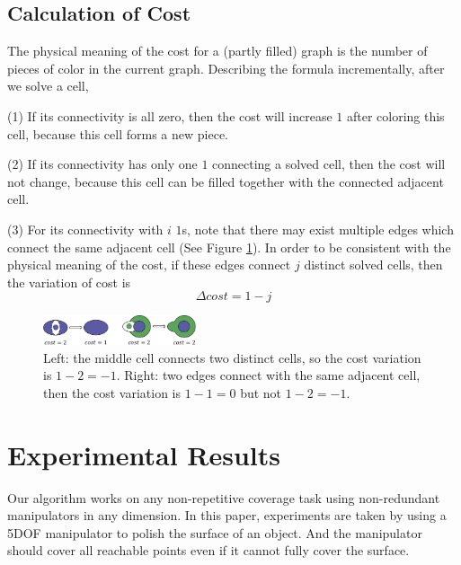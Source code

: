 \documentclass[journal]{IEEEtran}
\begin{document}
\subsection{Calculation of Cost}
The physical meaning of the cost for a (partly filled) graph is the number of pieces of color in the current graph. 
Describing the formula incrementally, after we solve a cell, 

(1) If its connectivity is all zero, then the cost will increase $1$ after coloring this cell, because this cell forms a new piece.

(2) If its connectivity has only one $1$ connecting a solved cell, then the cost will not change, because this cell can be filled together with the connected adjacent cell. 

(3) For its connectivity with $i$ $1$s, note that there may exist multiple edges which connect the same adjacent cell (See Figure \ref{figcost}). In order to be consistent with the physical meaning of the cost, if these edges connect $j$ distinct solved cells, then the variation of cost is 
$$\Delta cost = 1-j$$


\begin{figure}[t]
\centering
\includegraphics[width = 0.4\textwidth]{proof/costcal}
\caption{Left: the middle cell connects two distinct cells, so the cost variation is $1-2 = -1$. Right: two edges connect with the same adjacent cell, then the cost variation is $1-1 = 0$ but not $1-2 = -1$.}\label{figcost}
\end{figure}

\section{Experimental Results}\label{sectionexperiment}

Our algorithm works on any non-repetitive coverage task using non-redundant manipulators in any dimension. 
In this paper, experiments are taken by using a 5DOF manipulator to polish the surface of an object. And the manipulator should cover all reachable points even if it cannot fully cover the surface. 
\end{document}
